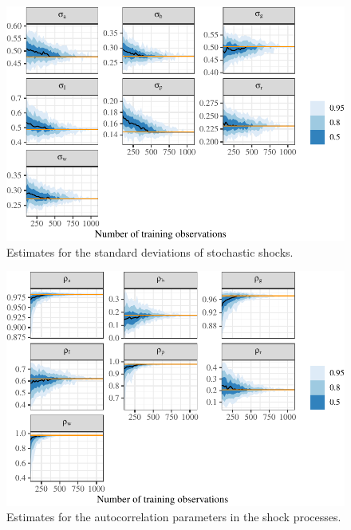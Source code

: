 \documentclass[11pt]{article}
\begin{document}
\begin{figure}[t]

{\centering \includegraphics{gfx/shock-sds-1} 

}

\caption{Estimates for the standard deviations of stochastic shocks.}\label{fig:shock-sds}
\end{figure}

\begin{figure}[t]

{\centering \includegraphics{gfx/autocorrelations-shocks-1} 

}

\caption{Estimates for the autocorrelation parameters in the shock processes.}\label{fig:autocorrelations-shocks}
\end{figure}
\end{document}
